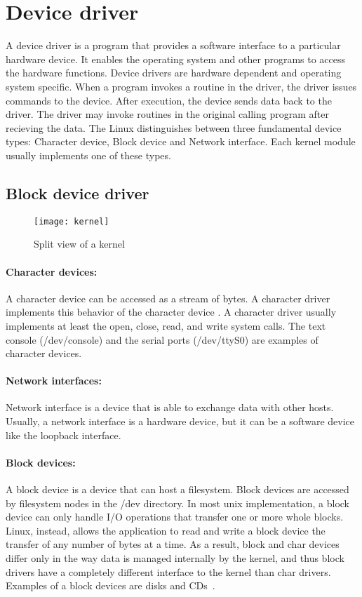 \section{Device driver}
\label{sec:device driver}
A device driver is a program that provides a software interface to a particular hardware device. It enables the operating system and other programs to access the hardware functions. Device drivers are hardware dependent and operating system specific. When a program invokes a routine in the driver, the driver issues commands to the device. After execution, the device sends data back to the driver. The driver may invoke routines in the original calling program after recieving the data. The Linux distinguishes between three fundamental device types: Character device, Block device and Network interface. Each kernel module usually implements one of these types.
\subsection{Block device driver}
\begin{figure}[!ht]
\centering
\texttt{[image: kernel]}
\caption{Split view of a kernel}
\label{fig:kernel}
\end{figure}
\paragraph{Character devices:} A character device can be accessed as a stream of bytes. A character driver implements this behavior of the character device . A character driver usually implements at least the open, close, read, and write system calls. The text console (/dev/console) and the serial ports (/dev/ttyS0) are examples of character devices.

\paragraph{Network interfaces:} Network interface is a device that is able to exchange data with other hosts. Usually, a network interface is a hardware device, but it can be a software device like the loopback interface. 

\paragraph{Block devices:} A block device is a device that can host a filesystem. Block devices are accessed by filesystem nodes in the /dev directory.  In most unix implementation, a block device can only handle I/O operations that transfer one or more whole blocks. Linux, instead, allows the application to read and write a block device the transfer of any number of bytes at a time. As a result, block and char devices differ only in the way data is managed internally by the kernel, and thus block drivers have a completely different interface to the kernel than char drivers. Examples of a block devices are disks and CDs~\cite{Corbet:2005:LDD:1209083}.

